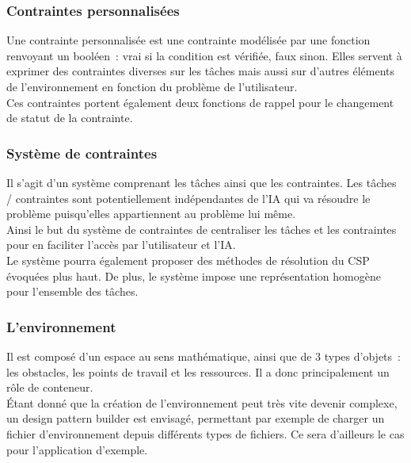 \subsubsection*{Contraintes personnalisées}

Une contrainte personnalisée est une contrainte modélisée par une fonction renvoyant un booléen~: vrai si la condition est vérifiée, faux sinon.
Elles servent à exprimer des contraintes diverses sur les tâches mais aussi sur d'autres éléments de l'environnement en fonction du problème de l'utilisateur.\\

Ces contraintes portent également deux fonctions de rappel pour le changement de statut de la contrainte.

\subsubsection*{Système de contraintes}
Il s'agit d'un système comprenant les tâches ainsi que les contraintes. Les  tâches / contraintes sont potentiellement indépendantes de l'IA qui va résoudre le problème puisqu'elles appartiennent au problème lui même.\\

Ainsi le but du système de contraintes de centraliser les tâches et les contraintes pour en faciliter l'accès par l'utilisateur et l'IA.\\
\indent Le système pourra également proposer des méthodes de résolution du CSP évoquées plus haut.
De plus, le système impose une représentation homogène pour l'ensemble des tâches.\\

{\color{blue}{
\noindent Schéma de classes du système.\\
Schéma d’interaction avec l'utilisateur.\\
Schéma d’interaction avec l'IA.
}}

\subsubsection*{L'environnement}

Il est composé d'un espace au sens mathématique, ainsi que de 3 types d'objets~: les obstacles, les points de travail et les ressources. Il a donc principalement un rôle de conteneur.\\

\'Etant donné que la création de l'environnement peut très vite devenir complexe, un design pattern builder est envisagé, permettant par exemple de charger un fichier d'environnement depuis différents types de fichiers.
Ce sera d'ailleurs le cas pour l'application d'exemple.

